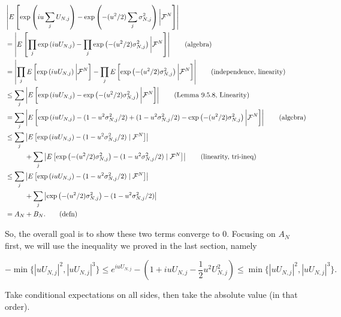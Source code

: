 \documentclass{article}
\begin{document}
\begin{align*}
&  \left| E\left[\exp\left( i u \sum_j U_{N,j} \right) -  \exp\left( -(u^2/2) \sum_j \sigma^2_{N,j}  \right)  \bigg\rvert \mathcal{F}^N \right] \right| \\
&=  \left| E\left[ \prod_j \exp\left( i u  U_{N,j} \right) -  \prod_j \exp\left( -(u^2/2) \sigma^2_{N,j}  \right)  \bigg\rvert \mathcal{F}^N \right] \right| \tag{algebra}\\
&=  \left|  \prod_j E\left[ \exp\left( i u  U_{N,j} \right)\bigg\rvert \mathcal{F}^N \right] -  \prod_j E\left[\exp\left( -(u^2/2) \sigma^2_{N,j}  \right)  \bigg\rvert \mathcal{F}^N \right] \right| \tag{independence, linearity} \\
&\le  \sum_j \left| E\left[  \exp\left( i u  U_{N,j} \right) - \exp\left( -(u^2/2) \sigma^2_{N,j}  \right)  \bigg\rvert \mathcal{F}^N \right] \right| \tag{Lemma 9.5.8, Linearity}\\
&=  \sum_j \left| E\left[  \exp\left( i u  U_{N,j} \right) - (1 - u^2 \sigma^2_{N,j}/2) + (1 - u^2 \sigma^2_{N,j}/2) -\exp\left( -(u^2/2) \sigma^2_{N,j}  \right)  \bigg\rvert \mathcal{F}^N \right] \right|  \tag{algebra}\\
&\le \sum_j \left| E\left[   \exp\left( i u U_{N,j} \right)  - (1 - u^2 \sigma^2_{N,j}/2) \mid \mathcal{F}^N \right] \right|  \\
&\hspace{10mm} + \sum_j  \left|E\left[  \exp\left( -(u^2/2) \sigma^2_{N,j}  \right) - (1 - u^2 \sigma^2_{N,j}/2)   \mid \mathcal{F}^N \right] \right| \tag{linearity, tri-ineq} \\
&\le \sum_j \left| E\left[   \exp\left( i u U_{N,j} \right)  - (1 - u^2 \sigma^2_{N,j}/2) \mid \mathcal{F}^N \right] \right|  \\
&\hspace{10mm} + \sum_j  \left|  \exp\left( -(u^2/2) \sigma^2_{N,j}  \right) - (1 - u^2 \sigma^2_{N,j}/2)    \right| \\
&= A_N + B_N. \tag{defn}
\end{align*}

So, the overall goal is to show these two terms converge to $0$. 
Focusing on $A_N$ first, we will use the inequality we proved in the last section, namely 

\[
-\min\{| u U_{N,j}|^2, | u U_{N,j}|^3 \} \le e^{i u U_{N,j}} - (1 +i u U_{N,j} - \frac{1}{2} u^2 U_{N,j}^2) \le \min\{| u U_{N,j}|^2, | u U_{N,j}|^3 \}.
\]

Take conditional expectations on all sides, then take the absolute value (in that order). 
\end{document}
